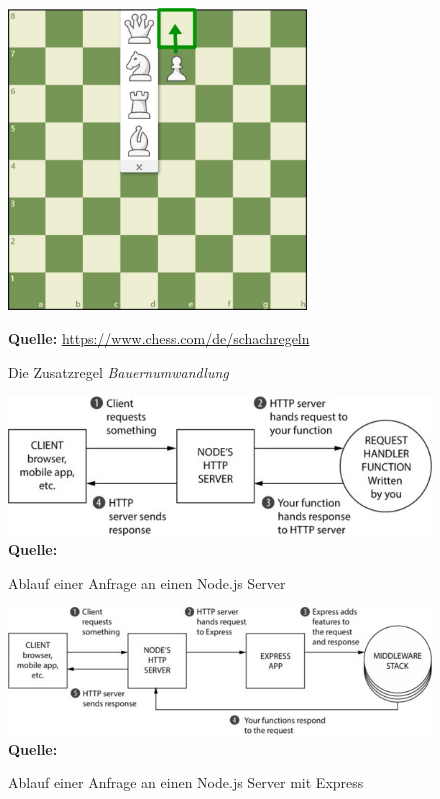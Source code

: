 \documentclass[a4paper,12pt]{report}
\begin{document}
  \begin{figure}[ht]
\centering
  \includegraphics[height=80mm]{promotion.jpeg}
   
   
\raggedleft
    \footnotesize\sffamily\textbf{Quelle:} \url{https://www.chess.com/de/schachregeln}
  \caption{Die Zusatzregel \textit{Bauernumwandlung}}
  \label{fig:promotion}
\end{figure}

  \begin{figure}[ht]
  \centering
  \includegraphics[width=160mm]{node-request.jpg}
\raggedleft
    \footnotesize\sffamily\textbf{Quelle:} \cite{expressbook}
  \caption{Ablauf einer Anfrage an einen Node.js Server}
  \label{fig:node-request}
\end{figure}


  \begin{figure}[ht]
  \centering
  \includegraphics[width=160mm]{express-request.jpg}
\raggedleft
    \footnotesize\sffamily\textbf{Quelle:} \cite{expressbook}
  \caption{Ablauf einer Anfrage an einen Node.js Server mit Express}
  \label{fig:express-request}
\end{figure}
\end{document}
